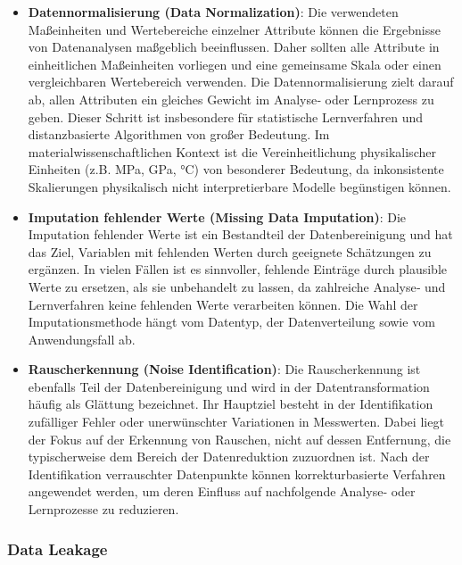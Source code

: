 \begin{itemize}
	\item \textbf{Datennormalisierung (Data Normalization)}:  
	Die verwendeten Maßeinheiten und Wertebereiche einzelner Attribute können die Ergebnisse von Datenanalysen maßgeblich beeinflussen. Daher sollten alle Attribute in einheitlichen Maßeinheiten vorliegen und eine gemeinsame Skala oder einen vergleichbaren Wertebereich verwenden.
	Die Datennormalisierung zielt darauf ab, allen Attributen ein gleiches Gewicht im Analyse‑ oder Lernprozess zu geben. Dieser Schritt ist insbesondere für statistische Lernverfahren und distanzbasierte Algorithmen von großer Bedeutung. 
	Im materialwissenschaftlichen Kontext ist die Vereinheitlichung physikalischer Einheiten (z.B. MPa, GPa, °C) von besonderer Bedeutung, da inkonsistente Skalierungen physikalisch nicht interpretierbare Modelle begünstigen können. \cite{saez2013predicting}
	
	\item \textbf{Imputation fehlender Werte (Missing Data Imputation)}:  
	Die Imputation fehlender Werte ist ein Bestandteil der Datenbereinigung und hat das Ziel, Variablen mit fehlenden Werten durch geeignete Schätzungen zu ergänzen. In vielen Fällen ist es sinnvoller, fehlende Einträge durch plausible Werte zu ersetzen, als sie unbehandelt zu lassen, da zahlreiche Analyse‑ und Lernverfahren keine fehlenden Werte verarbeiten können. Die Wahl der Imputationsmethode hängt vom Datentyp, der Datenverteilung sowie vom Anwendungsfall ab. \cite{luengo2012choice}
	
	\item \textbf{Rauscherkennung (Noise Identification)}:  
	Die Rauscherkennung ist ebenfalls Teil der Datenbereinigung und wird in der Datentransformation häufig als Glättung bezeichnet. Ihr Hauptziel besteht in der Identifikation zufälliger Fehler oder unerwünschter Variationen in Messwerten. Dabei liegt der Fokus auf der Erkennung von Rauschen, nicht auf dessen Entfernung, die typischerweise dem Bereich der Datenreduktion zuzuordnen ist. Nach der Identifikation verrauschter Datenpunkte können korrekturbasierte Verfahren angewendet werden, um deren Einfluss auf nachfolgende Analyse‑ oder Lernprozesse zu reduzieren. \cite{saez2013predicting}
\end{itemize}

\subsubsection{Data Leakage}

